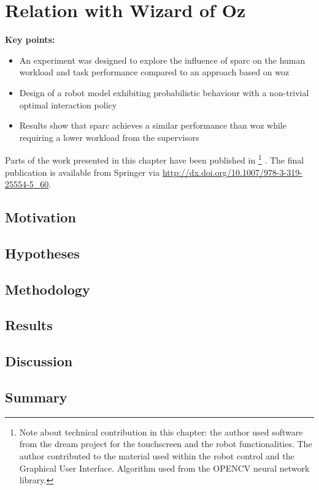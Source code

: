 \chapter{Relation with Wizard of Oz}\label{chap:woz}
\begin{framed}
	\textbf{Key points:}
	
	\begin{itemize}
		\item An experiment was designed to explore the influence of \gls{sparc} on the human workload and task performance compared to an approach based on \gls{woz}
		\item Design of a robot model exhibiting probabilistic behaviour with a non-trivial optimal interaction policy
		\item Results show that \gls{sparc} achieves a similar performance than \gls{woz} while requiring a lower workload from the supervisors
	\end{itemize}
\end{framed}

Parts of the work presented in this chapter have been published in \cite{senft2015sparc} \footnote{Note about technical contribution in this chapter: the author used software from the \gls{dream} project for the touchscreen and the robot functionalities. The author contributed to the material used within the robot control and the Graphical User Interface. Algorithm used from the OPENCV neural network library.} . The final publication is available from Springer via \url{http://dx.doi.org/10.1007/978-3-319-25554-5_60}.
\section{Motivation}

\section{Hypotheses}

\section{Methodology}

\section{Results}

\section{Discussion}

\section{Summary}

